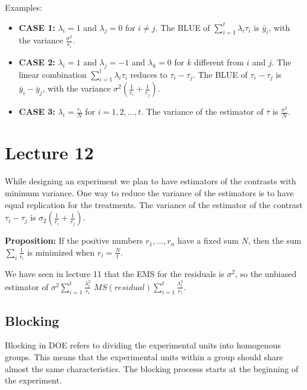 \documentclass{tufte-book}
\begin{document}
Examples:
\begin{itemize}
    \item \textbf{CASE 1:} $\lambda_i = 1$ and $\lambda_j = 0$ for $i \neq j$. The BLUE of $\sum_{i=1}^t \lambda_i \tau_i$ is 
    $\bar{y}_i$, with the variance $\frac{\sigma^2}{r_i}$.
    
    \item \textbf{CASE 2:} $\lambda_i = 1$ and $\lambda_j = -1$ and $\lambda_k = 0$ for $k$ different from $i$ and $j$. 
    The linear combination $\sum_{i=1}^t \lambda_i \tau_i$ reduces to $\tau_i - \tau_j$. The BLUE of $\tau_i - \tau_j$ is 
    $\bar{y}_i - \bar{y}_j$, with the variance $\sigma^2 \left( \frac{1}{r_i} + \frac{1}{r_j} \right)$.
    
    \item \textbf{CASE 3:} $\lambda_i = \frac{r_i}{N}$ for $i = 1, 2, \ldots, t$. The variance of the estimator of $\bar{\tau}$ 
    is $\frac{\sigma^2}{N}$.
\end{itemize}

\section{Lecture 12}

While designing an experiment we plan to have estimators of the contrasts with minimum variance. One way to reduce the variance
of the estimators is to have equal replication for the treatments. The variance of the estimator of the contrast
$\tau_{i} - \tau_{j}$ is $\sigma_{2}(\frac{1}{r_{i}} + \frac{1}{r_{j}})$.

\textbf{Proposition: } If the positive numbers $r_{1}, ... , r_{n}$ have a fixed sum $N$, then the sum $\sum_{i} \frac{1}{r_{i}}$ is minimized when 
$r_{i} = \frac{N}{t}$. 

We have seen in lecture 11 that the EMS for the residuals is $\sigma^{2}$, so the unbiased estimator of 
$\sigma^{2} \sum_{i = 1}^{t} \frac{\lambda_{i}^{2}}{r_{i}}$ $MS(residual) \sum_{i = 1}^{t} \frac{\lambda_{i}^{2}}{r_{i}}$.

\subsection{Blocking}

Blocking in DOE refers to dividing the experimental units into homogenous groups. This means that the experimental
units within a group should share almost the same characteristics. The blocking processs starts at the beginning of the 
experiment. 
\end{document}
